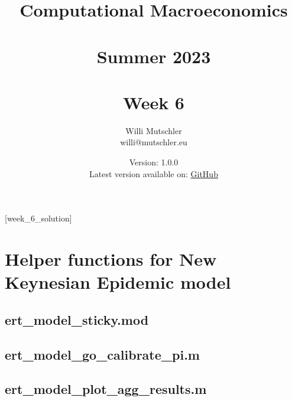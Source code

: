 
\newif\ifDisplaySolutions%


\title{Computational Macroeconomics\\~\\Summer 2023\\~\\Week 6}
\author{Willi Mutschler\\willi@mutschler.eu}
\date{Version: 1.0.0\\Latest version available on: \href{https://github.com/wmutschl/Computational-Macroeconomics/releases/latest/download/week_6.pdf}{GitHub}}
\maketitle\thispagestyle{empty}

\newpage
{}[week_6_solution]
\tableofcontents\thispagestyle{empty}\newpage

\setcounter{page}{1}

\printbibliography

\appendix
\section{Helper functions for New Keynesian Epidemic model}
\subsection{ert\_model\_sticky.mod\label{app:ert_model_sticky}}


\subsection{ert\_model\_go\_calibrate\_pi.m\label{app:ert_model_go_calibrate_pi}}


\subsection{ert\_model\_plot\_agg\_results.m\label{app:ert_model_plot_agg_results}}


